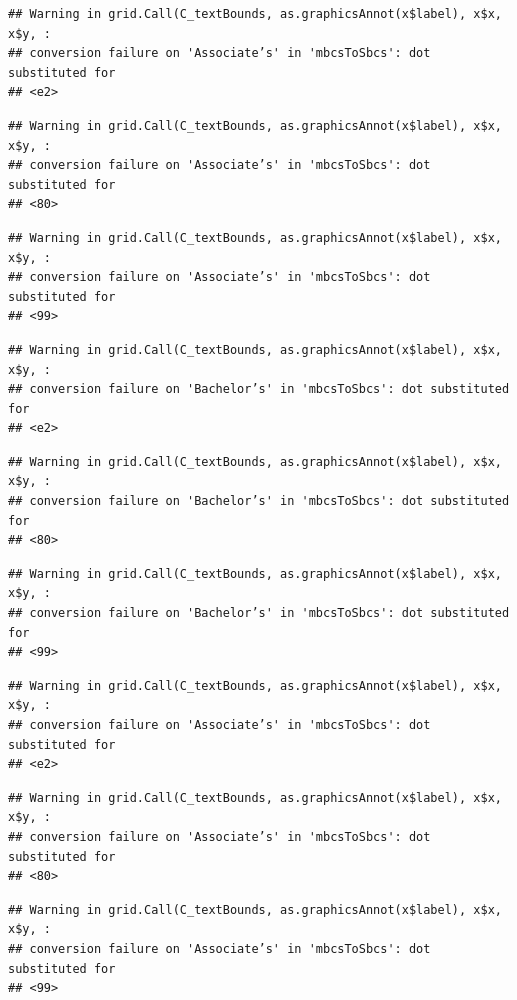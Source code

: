 \documentclass[
]{article}
\begin{document}
\begin{verbatim}
## Warning in grid.Call(C_textBounds, as.graphicsAnnot(x$label), x$x, x$y, :
## conversion failure on 'Associate’s' in 'mbcsToSbcs': dot substituted for
## <e2>
\end{verbatim}

\begin{verbatim}
## Warning in grid.Call(C_textBounds, as.graphicsAnnot(x$label), x$x, x$y, :
## conversion failure on 'Associate’s' in 'mbcsToSbcs': dot substituted for
## <80>
\end{verbatim}

\begin{verbatim}
## Warning in grid.Call(C_textBounds, as.graphicsAnnot(x$label), x$x, x$y, :
## conversion failure on 'Associate’s' in 'mbcsToSbcs': dot substituted for
## <99>
\end{verbatim}

\begin{verbatim}
## Warning in grid.Call(C_textBounds, as.graphicsAnnot(x$label), x$x, x$y, :
## conversion failure on 'Bachelor’s' in 'mbcsToSbcs': dot substituted for
## <e2>
\end{verbatim}

\begin{verbatim}
## Warning in grid.Call(C_textBounds, as.graphicsAnnot(x$label), x$x, x$y, :
## conversion failure on 'Bachelor’s' in 'mbcsToSbcs': dot substituted for
## <80>
\end{verbatim}

\begin{verbatim}
## Warning in grid.Call(C_textBounds, as.graphicsAnnot(x$label), x$x, x$y, :
## conversion failure on 'Bachelor’s' in 'mbcsToSbcs': dot substituted for
## <99>
\end{verbatim}

\begin{verbatim}
## Warning in grid.Call(C_textBounds, as.graphicsAnnot(x$label), x$x, x$y, :
## conversion failure on 'Associate’s' in 'mbcsToSbcs': dot substituted for
## <e2>
\end{verbatim}

\begin{verbatim}
## Warning in grid.Call(C_textBounds, as.graphicsAnnot(x$label), x$x, x$y, :
## conversion failure on 'Associate’s' in 'mbcsToSbcs': dot substituted for
## <80>
\end{verbatim}

\begin{verbatim}
## Warning in grid.Call(C_textBounds, as.graphicsAnnot(x$label), x$x, x$y, :
## conversion failure on 'Associate’s' in 'mbcsToSbcs': dot substituted for
## <99>
\end{verbatim}
\end{document}
